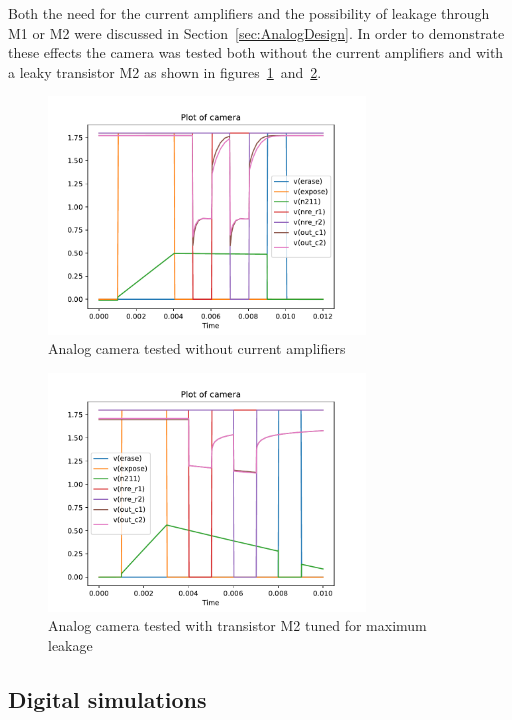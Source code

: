 Both the need for the current amplifiers and the possibility of leakage through M1 or M2 were discussed in Section~\ref{sec:AnalogDesign}.
In order to demonstrate these effects the camera was tested both without the current amplifiers and with a leaky transistor M2 as shown in figures~\ref{fig:analog4003nocurrent}~and~\ref{fig:analogLeakingM2}.

\begin{figure}[H]
  \centering
  \includegraphics[width=0.75\textwidth]{../analog/camera4003nocurrentamp}
  \caption{Analog camera tested without current amplifiers}
  \label{fig:analog4003nocurrent}
\end{figure}

\begin{figure}[H]
  \centering
  \includegraphics[width=0.75\textwidth]{../analog/cameraLeakingM2}
  \caption{Analog camera tested with transistor M2 tuned for maximum leakage}
  \label{fig:analogLeakingM2}
\end{figure}



\newpage
\subsection{Digital simulations}


